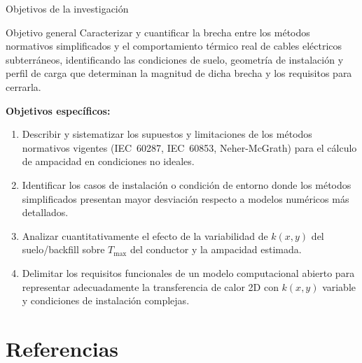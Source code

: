 \documentclass[aspectratio=169]{beamer}
\begin{document}
\begin{frame}{Objetivos de la investigación}

\begin{block}{Objetivo general}
\justifying\small
Caracterizar y cuantificar la brecha entre los métodos normativos simplificados y
el comportamiento térmico real de cables eléctricos subterráneos, identificando
las condiciones de suelo, geometría de instalación y perfil de carga que
determinan la magnitud de dicha brecha y los requisitos para cerrarla.
\end{block}

\vspace{0.4em}
\textbf{Objetivos específicos:}
\begin{enumerate}[leftmargin=*]\small
  \item Describir y sistematizar los supuestos y limitaciones de los métodos
        normativos vigentes (IEC~60287, IEC~60853, Neher-McGrath) para el
        cálculo de ampacidad en condiciones no ideales.
  \item Identificar los casos de instalación o condición de entorno donde los
        métodos simplificados presentan mayor desviación respecto a modelos
        numéricos más detallados.
  \item Analizar cuantitativamente el efecto de la variabilidad de $k(x,y)$
        del suelo/backfill sobre $T_{\max}$ del conductor y la ampacidad estimada.
  \item Delimitar los requisitos funcionales de un modelo computacional abierto
        para representar adecuadamente la transferencia de calor 2D con $k(x,y)$
        variable y condiciones de instalación complejas.
\end{enumerate}
\end{frame}


\section{Referencias}
\end{document}
